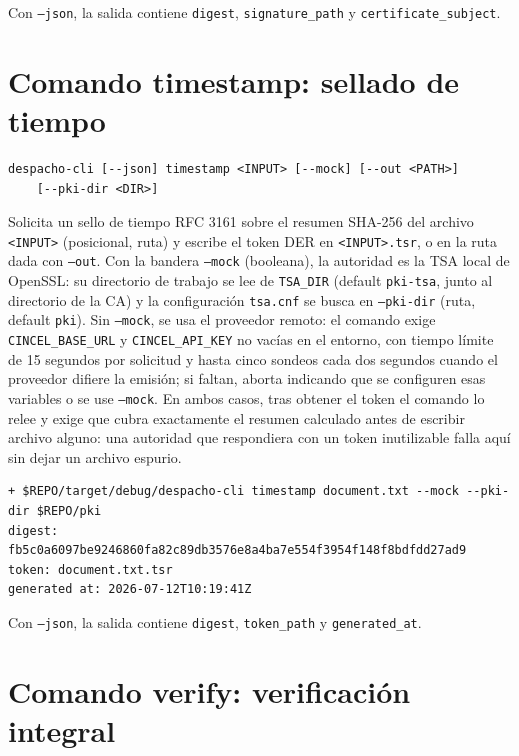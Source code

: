 Con \texttt{--json}, la salida contiene \texttt{digest}, \texttt{signature\_path} y \texttt{certificate\_subject}.

\section{Comando timestamp: sellado de tiempo}\label{sec:cli-timestamp}

\begin{lstlisting}[numbers=none]
despacho-cli [--json] timestamp <INPUT> [--mock] [--out <PATH>]
    [--pki-dir <DIR>]
\end{lstlisting}

Solicita un sello de tiempo RFC 3161 sobre el resumen SHA-256 del archivo \texttt{<INPUT>} (posicional, ruta) y escribe el token DER en \texttt{<INPUT>.tsr}, o en la ruta dada con \texttt{--out}. Con la bandera \texttt{--mock} (booleana), la autoridad es la TSA local de OpenSSL: su directorio de trabajo se lee de \texttt{TSA\_DIR} (default \texttt{pki-tsa}, junto al directorio de la CA) y la configuración \texttt{tsa.cnf} se busca en \texttt{--pki-dir} (ruta, default \texttt{pki}). Sin \texttt{--mock}, se usa el proveedor remoto: el comando exige \texttt{CINCEL\_BASE\_URL} y \texttt{CINCEL\_API\_KEY} no vacías en el entorno, con tiempo límite de 15 segundos por solicitud y hasta cinco sondeos cada dos segundos cuando el proveedor difiere la emisión; si faltan, aborta indicando que se configuren esas variables o se use \texttt{--mock}. En ambos casos, tras obtener el token el comando lo relee y exige que cubra exactamente el resumen calculado antes de escribir archivo alguno: una autoridad que respondiera con un token inutilizable falla aquí sin dejar un archivo espurio.

\begin{lstlisting}[numbers=none]
+ $REPO/target/debug/despacho-cli timestamp document.txt --mock --pki-dir $REPO/pki
digest: fb5c0a6097be9246860fa82c89db3576e8a4ba7e554f3954f148f8bdfdd27ad9
token: document.txt.tsr
generated at: 2026-07-12T10:19:41Z
\end{lstlisting}

Con \texttt{--json}, la salida contiene \texttt{digest}, \texttt{token\_path} y \texttt{generated\_at}.

\section{Comando verify: verificación integral}\label{sec:cli-verify}

